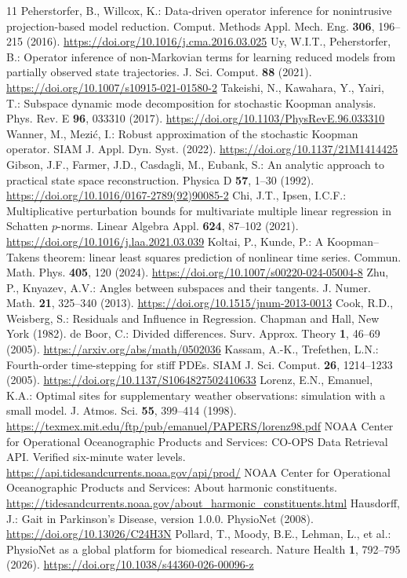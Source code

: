 \documentclass[11pt,a4paper]{article}
\begin{document}
\begin{thebibliography}{11}
 Peherstorfer, B., Willcox, K.: Data-driven operator inference for nonintrusive projection-based model reduction. Comput. Methods Appl. Mech. Eng. \textbf{306}, 196--215 (2016). \url{https://doi.org/10.1016/j.cma.2016.03.025}
 Uy, W.I.T., Peherstorfer, B.: Operator inference of non-Markovian terms for learning reduced models from partially observed state trajectories. J. Sci. Comput. \textbf{88} (2021). \url{https://doi.org/10.1007/s10915-021-01580-2}
 Takeishi, N., Kawahara, Y., Yairi, T.: Subspace dynamic mode decomposition for stochastic Koopman analysis. Phys. Rev. E \textbf{96}, 033310 (2017). \url{https://doi.org/10.1103/PhysRevE.96.033310}
 Wanner, M., Mezi\'c, I.: Robust approximation of the stochastic Koopman operator. SIAM J. Appl. Dyn. Syst. (2022). \url{https://doi.org/10.1137/21M1414425}
 Gibson, J.F., Farmer, J.D., Casdagli, M., Eubank, S.: An analytic approach to practical state space reconstruction. Physica D \textbf{57}, 1--30 (1992). \url{https://doi.org/10.1016/0167-2789(92)90085-2}
 Chi, J.T., Ipsen, I.C.F.: Multiplicative perturbation bounds for multivariate multiple linear regression in Schatten $p$-norms. Linear Algebra Appl. \textbf{624}, 87--102 (2021). \url{https://doi.org/10.1016/j.laa.2021.03.039}
 Koltai, P., Kunde, P.: A Koopman--Takens theorem: linear least squares prediction of nonlinear time series. Commun. Math. Phys. \textbf{405}, 120 (2024). \url{https://doi.org/10.1007/s00220-024-05004-8}
 Zhu, P., Knyazev, A.V.: Angles between subspaces and their tangents. J. Numer. Math. \textbf{21}, 325--340 (2013). \url{https://doi.org/10.1515/jnum-2013-0013}
 Cook, R.D., Weisberg, S.: Residuals and Influence in Regression. Chapman and Hall, New York (1982).
 de Boor, C.: Divided differences. Surv. Approx. Theory \textbf{1}, 46--69 (2005). \url{https://arxiv.org/abs/math/0502036}
 Kassam, A.-K., Trefethen, L.N.: Fourth-order time-stepping for stiff PDEs. SIAM J. Sci. Comput. \textbf{26}, 1214--1233 (2005). \url{https://doi.org/10.1137/S1064827502410633}
 Lorenz, E.N., Emanuel, K.A.: Optimal sites for supplementary weather observations: simulation with a small model. J. Atmos. Sci. \textbf{55}, 399--414 (1998). \url{https://texmex.mit.edu/ftp/pub/emanuel/PAPERS/lorenz98.pdf}
 NOAA Center for Operational Oceanographic Products and Services: CO-OPS Data Retrieval API. Verified six-minute water levels. \url{https://api.tidesandcurrents.noaa.gov/api/prod/}
 NOAA Center for Operational Oceanographic Products and Services: About harmonic constituents. \url{https://tidesandcurrents.noaa.gov/about_harmonic_constituents.html}
 Hausdorff, J.: Gait in Parkinson's Disease, version 1.0.0. PhysioNet (2008). \url{https://doi.org/10.13026/C24H3N}
 Pollard, T., Moody, B.E., Lehman, L., et al.: PhysioNet as a global platform for biomedical research. Nature Health \textbf{1}, 792--795 (2026). \url{https://doi.org/10.1038/s44360-026-00096-z}
\end{thebibliography}
\end{document}
